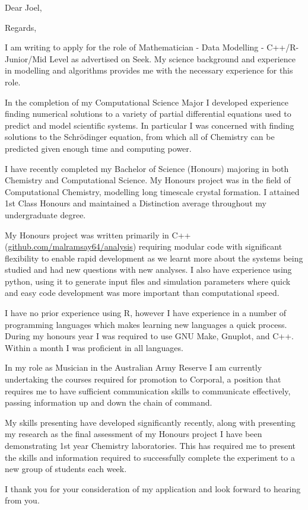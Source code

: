 


\recipient{~}{~}
\date{\today}
\opening{Dear Joel,}
\closing{Regards,}



\makelettertitle

I am writing to apply for the role of Mathematician - Data Modelling - C++/R- Junior/Mid Level as advertised on Seek. My science background and experience in modelling and algorithms provides me with the necessary experience for this role.

In the completion of my Computational Science Major I developed experience finding numerical solutions to a variety of partial differential equations used to predict and model scientific systems. In particular I was concerned with finding solutions to the Schr\"odinger equation, from which all of Chemistry can be predicted given enough time and computing power.

I have recently completed my Bachelor of Science (Honours) majoring in both Chemistry and Computational Science. My Honours project was in the field of Computational Chemistry, modelling long timescale crystal formation. I attained 1st Class Honours and maintained a Distinction average throughout my undergraduate degree.

My Honours project was written primarily in C++ (\href{http://github.com/malramsay64/analysis}{github.com/malramsay64/analysis}) requiring modular code with significant flexibility to enable rapid development as we learnt more about the systems being studied and had new questions with new analyses. I also have experience using python, using it to generate input files and simulation parameters where quick and easy code development was more important than computational speed.

I have no prior experience using R, however I have experience in a number of programming languages which makes learning new languages a quick process. During my honours year I was required to use GNU Make, Gnuplot, and C++. Within a month I was proficient in all languages.

In my role as Musician in the Australian Army Reserve I am currently undertaking the courses required for promotion to Corporal, a position that requires me to have sufficient communication skills to communicate effectively, passing information up and down the chain of command.

My skills presenting have developed significantly recently, along with presenting my research as the final assessment of my Honours project I have been demonstrating 1st year Chemistry laboratories. This has required me to present the skills and information required to successfully complete the experiment to a new group of students each week.

I thank you for your consideration of my application and look forward to hearing from you.

\makeletterclosing


